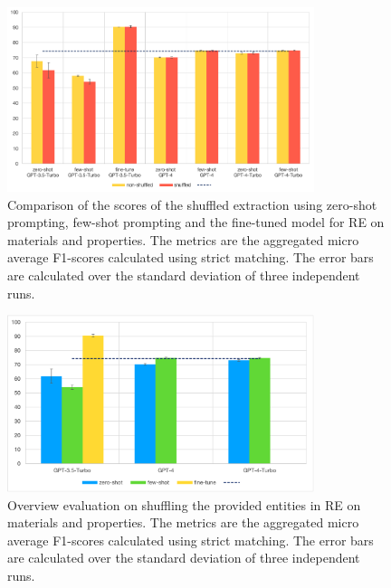 \begin{figure}[htbp]
  \centering
  \includegraphics[width=0.8\textwidth]{figures/re-eval-all.png} 
  \caption{Comparison of the scores of the shuffled extraction using zero-shot prompting, few-shot prompting and the fine-tuned model for RE on materials and properties. The metrics are the aggregated micro average F1-scores calculated using strict matching. The error bars are calculated over the standard deviation of three independent runs.}
  \label{fig:re-eval-all}
\end{figure}

\begin{figure}[htbp]
  \centering
  \includegraphics[width=0.8\textwidth]{figures/re-eval-shuffled-all.png} 
  \caption{Overview evaluation on shuffling the provided entities in RE on materials and properties. The metrics are the aggregated micro average F1-scores calculated using strict matching. The error bars are calculated over the standard deviation of three independent runs.}
  \label{fig:re-eval-shuffled-all}
\end{figure}

